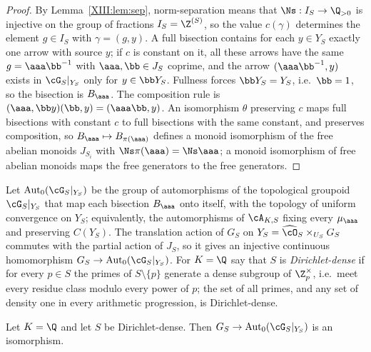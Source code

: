 \begin{proof}
By Lemma~\ref{XIII:lem:sep}, norm-separation means that $\Ns:I_S\to\Q_{>0}$ is injective on the
group of fractions $I_S=\Z^{(S)}$, so the value $c(\gamma)$ determines the element
$g\in I_S$ with $\gamma=(g,y)$. A full bisection contains for each $y\in Y_S$ exactly one
arrow with source $y$; if $c$ is constant on it, all these arrows have the same $g=\aaa\bb^{-1}$
with $\aaa,\bb\in J_S$ coprime, and the arrow $(\aaa\bb^{-1},y)$ exists in $\cG_S|_{Y_S}$ only
for $y\in\bb Y_S$. Fullness forces $\bb Y_S=Y_S$, i.e.\ $\bb=1$, so the bisection is $B_\aaa$.
The composition rule is $(\aaa,\bb y)(\bb,y)=(\aaa\bb,y)$. An isomorphism $\theta$ preserving $c$ maps full
bisections with constant $c$ to full bisections with the same constant, and preserves
composition, so $B_\aaa\mapsto B_{\pi(\aaa)}$ defines a monoid isomorphism of the free
abelian monoids $J_{S_i}$ with $\Ns\pi(\aaa)=\Ns\aaa$; a monoid isomorphism of free abelian
monoids maps the free generators to the free generators.
\end{proof}

\begin{definition}\label{XIII:def:frobdense}
Let $\operatorname{Aut}_0(\cG_S|_{Y_S})$ be the group of automorphisms of the topological
groupoid $\cG_S|_{Y_S}$ that map each bisection $B_\aaa$ onto itself, with the topology of
uniform convergence on $Y_S$; equivalently, the automorphisms of $\cA_{K,S}$ fixing every
$\mu_\aaa$ and preserving $C(Y_S)$. The translation action of $G_S$ on
$Y_S=\widehat{\cO}_S\times_{U_S}G_S$ commutes with the partial action of $J_S$, so it gives an
injective continuous homomorphism $G_S\to\operatorname{Aut}_0(\cG_S|_{Y_S})$. For $K=\Q$ say
that $S$ is \emph{Dirichlet-dense} if for every $p\in S$ the primes of $S\setminus\{p\}$
generate a dense subgroup of $\Z_p^\times$, i.e.\ meet every residue class modulo every
power of $p$; the set of all primes, and any set of density one in every arithmetic
progression, is Dirichlet-dense.
\end{definition}

\begin{proposition}\label{XIII:prop:aut}
Let $K=\Q$ and let $S$ be Dirichlet-dense. Then $G_S\to\operatorname{Aut}_0(\cG_S|_{Y_S})$ is an
isomorphism.
\end{proposition}

